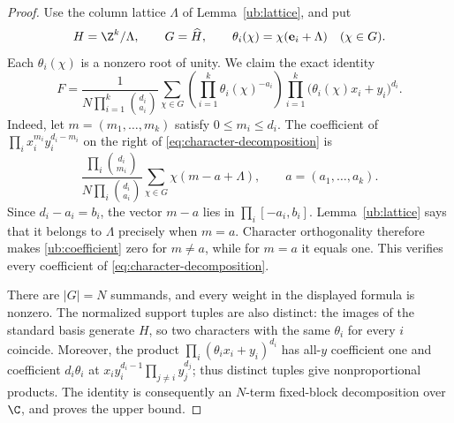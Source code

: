 \begin{proof}
Use the column lattice $\Lambda$ of Lemma~\ref{ub:lattice}, and put
\[
 H=\Z^k/\Lambda,\qquad G=\widehat H,
 \qquad \theta_i(\chi)=\chi(\mathbf{e}_i+\Lambda)
 \quad(\chi\in G).
\]
Each $\theta_i(\chi)$ is a nonzero root of unity. We claim the exact
identity
\begin{equation}
 \boxed{
 F=
 \frac{1}{N\prod_{i=1}^k\binom{d_i}{a_i}}
 \sum_{\chi\in G}
 \left(\prod_{i=1}^k\theta_i(\chi)^{-a_i}\right)
 \prod_{i=1}^k\bigl(\theta_i(\chi)x_i+y_i\bigr)^{d_i}.}
 \label{eq:character-decomposition}
\end{equation}
Indeed, let $m=(m_1,\ldots,m_k)$ satisfy $0\leq m_i\leq d_i$.
The coefficient of $\prod_i x_i^{m_i}y_i^{d_i-m_i}$ on the right
of \eqref{eq:character-decomposition} is
\begin{equation}
 \frac{\prod_i\binom{d_i}{m_i}}
      {N\prod_i\binom{d_i}{a_i}}
 \sum_{\chi\in G}\chi(m-a+\Lambda),
 \qquad a=(a_1,\ldots,a_k).
 \label{ub:coefficient}
\end{equation}
Since $d_i-a_i=b_i$, the vector $m-a$ lies in
$\prod_i[-a_i,b_i]$. Lemma~\ref{ub:lattice} says that it belongs
to $\Lambda$ precisely when $m=a$. Character orthogonality therefore
makes \eqref{ub:coefficient} zero for $m\ne a$, while for $m=a$
it equals one. This verifies every coefficient of
\eqref{eq:character-decomposition}.

There are $|G|=N$ summands, and every weight in the displayed formula
is nonzero. The normalized support tuples are also distinct: the images
of the standard basis generate $H$, so two characters with the same
$\theta_i$ for every $i$ coincide. Moreover, the product
$\prod_i(\theta_i x_i+y_i)^{d_i}$ has all-$y$ coefficient one and
coefficient $d_i\theta_i$ at
$x_i y_i^{d_i-1}\prod_{j\ne i}y_j^{d_j}$; thus distinct tuples give
nonproportional products. The identity is consequently an $N$-term
fixed-block decomposition over $\C$, and proves the upper bound.
\end{proof}
